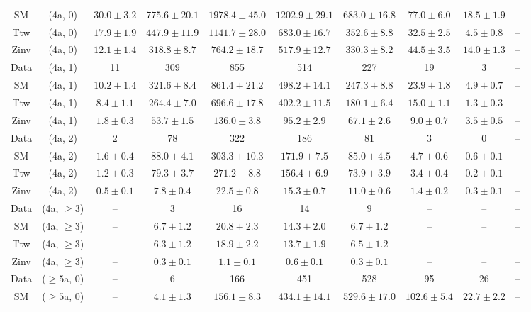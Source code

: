 \begin{table}[h!]
{\begin{tabular}{cccccccccc}
	SM & (4a, 0) & $30.0\pm 3.2$ & $775.6\pm 20.1$ & $1978.4\pm 45.0$ & $1202.9\pm 29.1$ & $683.0\pm 16.8$ & $77.0\pm 6.0$ & $18.5\pm 1.9$ & -- \\[0.5ex] 
	Ttw & (4a, 0) & $17.9\pm 1.9$ & $447.9\pm 11.9$ & $1141.7\pm 28.0$ & $683.0\pm 16.7$ & $352.6\pm 8.8$ & $32.5\pm 2.5$ & $4.5\pm 0.8$ & -- \\[0.5ex] 
	Zinv & (4a, 0) & $12.1\pm 1.4$ & $318.8\pm 8.7$ & $764.2\pm 18.7$ & $517.9\pm 12.7$ & $330.3\pm 8.2$ & $44.5\pm 3.5$ & $14.0\pm 1.3$ & -- \\[0.5ex] 
	Data & (4a, 1) & 11 & 309 & 855 & 514 & 227 & 19 & 3 & -- \\[0.5ex] 
	SM & (4a, 1) & $10.2\pm 1.4$ & $321.6\pm 8.4$ & $861.4\pm 21.2$ & $498.2\pm 14.1$ & $247.3\pm 8.8$ & $23.9\pm 1.8$ & $4.9\pm 0.7$ & -- \\[0.5ex] 
	Ttw & (4a, 1) & $8.4\pm 1.1$ & $264.4\pm 7.0$ & $696.6\pm 17.8$ & $402.2\pm 11.5$ & $180.1\pm 6.4$ & $15.0\pm 1.1$ & $1.3\pm 0.3$ & -- \\[0.5ex] 
	Zinv & (4a, 1) & $1.8\pm 0.3$ & $53.7\pm 1.5$ & $136.0\pm 3.8$ & $95.2\pm 2.9$ & $67.1\pm 2.6$ & $9.0\pm 0.7$ & $3.5\pm 0.5$ & -- \\[0.5ex] 
	Data & (4a, 2) & 2 & 78 & 322 & 186 & 81 & 3 & 0 & -- \\[0.5ex] 
	SM & (4a, 2) & $1.6\pm 0.4$ & $88.0\pm 4.1$ & $303.3\pm 10.3$ & $171.9\pm 7.5$ & $85.0\pm 4.5$ & $4.7\pm 0.6$ & $0.6\pm 0.1$ & -- \\[0.5ex] 
	Ttw & (4a, 2) & $1.2\pm 0.3$ & $79.3\pm 3.7$ & $271.2\pm 8.8$ & $156.4\pm 6.9$ & $73.9\pm 3.9$ & $3.4\pm 0.4$ & $0.2\pm 0.1$ & -- \\[0.5ex] 
	Zinv & (4a, 2) & $0.5\pm 0.1$ & $7.8\pm 0.4$ & $22.5\pm 0.8$ & $15.3\pm 0.7$ & $11.0\pm 0.6$ & $1.4\pm 0.2$ & $0.3\pm 0.1$ & -- \\[0.5ex] 
	Data & (4a, $\ge3$) & -- & 3 & 16 & 14 & 9 & -- & -- & -- \\[0.5ex] 
	SM & (4a, $\ge3$) & -- & $6.7\pm 1.2$ & $20.8\pm 2.3$ & $14.3\pm 2.0$ & $6.7\pm 1.2$ & -- & -- & -- \\[0.5ex] 
	Ttw & (4a, $\ge3$) & -- & $6.3\pm 1.2$ & $18.9\pm 2.2$ & $13.7\pm 1.9$ & $6.5\pm 1.2$ & -- & -- & -- \\[0.5ex] 
	Zinv & (4a, $\ge3$) & -- & $0.3\pm 0.1$ & $1.1\pm 0.1$ & $0.6\pm 0.1$ & $0.3\pm 0.1$ & -- & -- & -- \\[0.5ex] 
	Data & ($\ge5$a, 0) & -- & 6 & 166 & 451 & 528 & 95 & 26 & -- \\[0.5ex] 
	SM & ($\ge5$a, 0) & -- & $4.1\pm 1.3$ & $156.1\pm 8.3$ & $434.1\pm 14.1$ & $529.6\pm 17.0$ & $102.6\pm 5.4$ & $22.7\pm 2.2$ & -- \\[0.5ex] 

\end{tabular}}
\end{table}
